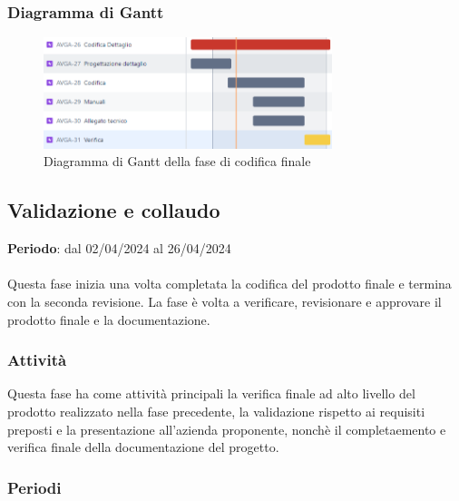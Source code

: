 \newpage 
\subsubsection{Diagramma di Gantt}\label{sec:pianificazione:progCodifica:gantt}

\begin{figure}[H]
    \centering
    \includegraphics[width=0.75\textwidth]{images/gantt_dettaglio.PNG}
    \caption{Diagramma di Gantt della fase di codifica finale}
    \label{fig:gantt_codRTB}
\end{figure}


\subsection{Validazione e collaudo}\label{sec:pianificazione:val_collaudo}

\textbf{Periodo}: dal 02/04/2024 al 26/04/2024\\\\
Questa fase inizia una volta completata la codifica del prodotto finale e termina con la seconda revisione. La fase è volta a verificare, revisionare e approvare il prodotto finale e la documentazione.

\subsubsection{Attività}\label{sec:pianificazione:val_collaudo:attivita}
Questa fase ha come attività principali la verifica finale ad alto livello del prodotto realizzato nella fase precedente, la validazione rispetto ai requisiti preposti e la presentazione all'azienda proponente, nonchè il completaemento e verifica finale della documentazione del progetto.

\subsubsection{Periodi}\label{sec:pianificazione:val_collaudo:periodi}
